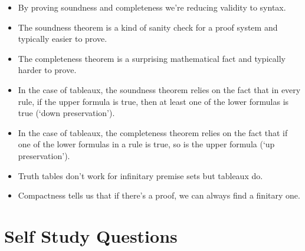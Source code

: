 \begin{itemize}

	\item By proving soundness and completeness we're reducing validity to syntax.
	
	\item The soundness theorem is a kind of sanity check for a proof system and typically easier to prove.
	
	\item The completeness theorem is a surprising mathematical fact and typically harder to prove.
	
	\item In the case of tableaux, the soundness theorem relies on the fact that in every rule, if the upper formula is true, then at least one of the lower formulas is true (`down preservation').
	
	\item In the case of tableaux, the completeness theorem relies on the fact that if one of the lower formulas in a rule is true, so is the upper formula (`up preservation').
	
	\item Truth tables don't work for infinitary premise sets but tableaux do.
	
	\item Compactness tells us that if there's a proof, we can always find a finitary one.

\end{itemize}

\section{Self Study Questions}

